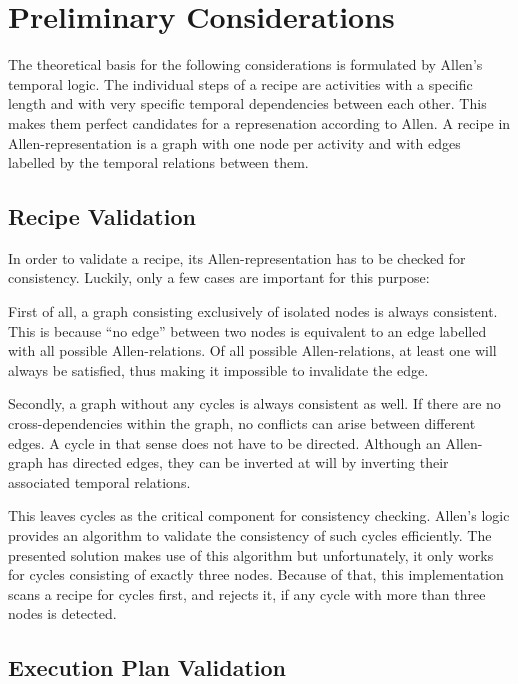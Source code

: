 \chapter{Preliminary Considerations}

    The theoretical basis for the following considerations is formulated
    by Allen's temporal logic. The individual steps of a recipe are activities
    with a specific length and with very specific temporal dependencies between each other. This
    makes them perfect candidates for a represenation according to Allen. A
    recipe in Allen-representation is a graph with one node per activity and with edges
    labelled by the temporal relations between them.
    
    \section{Recipe Validation}
    
    In order to validate a recipe, its Allen-representation has to be checked
    for consistency. Luckily, only a few cases are important for this purpose:
    
    First of all, a graph consisting exclusively of isolated nodes
    is always consistent. This is because ``no edge'' between two nodes is equivalent to
    an edge labelled with all possible Allen-relations. Of all possible
    Allen-relations, at least one will always be satisfied, thus making it
    impossible to invalidate the edge.
    
    Secondly, a graph without any cycles is always consistent as well. If there
    are no cross-dependencies within the graph, no conflicts can arise between
    different edges. A cycle in that sense does not have to be directed.
    Although an Allen-graph has directed edges, they can be inverted at will by
    inverting their associated temporal relations.
    
    This leaves cycles as the critical component for consistency checking.
    Allen's logic provides an algorithm to validate the consistency of such
    cycles efficiently. The presented solution makes use of this
    algorithm but unfortunately, it only works for cycles consisting of exactly
    three nodes. Because of that, this implementation scans a recipe for cycles
    first, and rejects it, if any cycle with more than three nodes is detected.
    
    \section{Execution Plan Validation}
    

